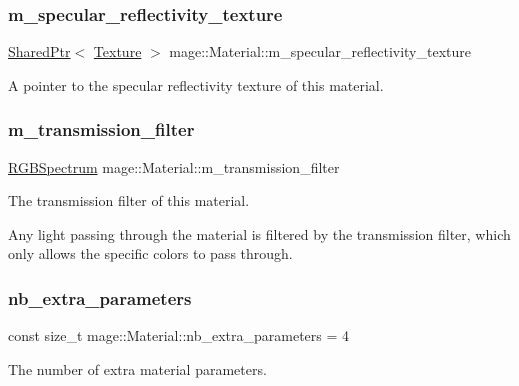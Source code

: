 \subsubsection{\texorpdfstring{m\+\_\+specular\+\_\+reflectivity\+\_\+texture}{m\_specular\_reflectivity\_texture}}
{\footnotesize\ttfamily \hyperlink{namespacemage_a1e01ae66713838a7a67d30e44c67703e}{Shared\+Ptr}$<$ \hyperlink{classmage_1_1_texture}{Texture} $>$ mage\+::\+Material\+::m\+\_\+specular\+\_\+reflectivity\+\_\+texture\hspace{0.3cm}{\ttfamily [private]}}

A pointer to the specular reflectivity texture of this material. \hypertarget{structmage_1_1_material_a9573a0d2a5fb0322f9eb103ace34dd47}{}\label{structmage_1_1_material_a9573a0d2a5fb0322f9eb103ace34dd47} 
\subsubsection{\texorpdfstring{m\+\_\+transmission\+\_\+filter}{m\_transmission\_filter}}
{\footnotesize\ttfamily \hyperlink{structmage_1_1_r_g_b_spectrum}{R\+G\+B\+Spectrum} mage\+::\+Material\+::m\+\_\+transmission\+\_\+filter\hspace{0.3cm}{\ttfamily [private]}}

The transmission filter of this material.

Any light passing through the material is filtered by the transmission filter, which only allows the specific colors to pass through. \hypertarget{structmage_1_1_material_a91e2bfd0c66c244bbae0faddbee1119f}{}\label{structmage_1_1_material_a91e2bfd0c66c244bbae0faddbee1119f} 
\subsubsection{\texorpdfstring{nb\+\_\+extra\+\_\+parameters}{nb\_extra\_parameters}}
{\footnotesize\ttfamily const size\+\_\+t mage\+::\+Material\+::nb\+\_\+extra\+\_\+parameters = 4\hspace{0.3cm}{\ttfamily [static]}}

The number of extra material parameters. 